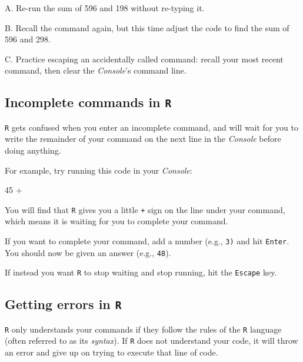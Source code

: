 \documentclass[
]{book}
\newenvironment{Shaded}{\begin{snugshade}}{\end{snugshade}}
\newcommand{\DecValTok}[1]{\textcolor[rgb]{0.00,0.00,0.81}{#1}}
\newcommand{\SpecialCharTok}[1]{\textcolor[rgb]{0.00,0.00,0.00}{#1}}
\begin{document}
A. Re-run the sum of 596 and 198 without re-typing it.

B. Recall the command again, but this time adjust the code to find the sum of 596 and 298.

C. Practice escaping an accidentally called command: recall your most recent command, then clear the \emph{Console}'s command line.

\hypertarget{incomplete-commands-in-r}{%
\subsection*{\texorpdfstring{Incomplete commands in \texttt{R}}{Incomplete commands in R}}\label{incomplete-commands-in-r}}

\texttt{R} gets confused when you enter an incomplete command, and will wait for you to write the remainder of your command on the next line in the \emph{Console} before doing anything.

For example, try running this code in your \emph{Console}:

\begin{Shaded}
\begin{Highlighting}[]
\DecValTok{45} \SpecialCharTok{+}
\end{Highlighting}
\end{Shaded}

You will find that \texttt{R} gives you a little \texttt{+} sign on the line under your command, which means it is waiting for you to complete your command.

If you want to complete your command, add a number (e.g., \texttt{3)} and hit \texttt{Enter}. You should now be given an answer (e.g., \texttt{48}).

If instead you want \texttt{R} to stop waiting and stop running, hit the \texttt{Escape} key.

\hypertarget{getting-errors-in-r}{%
\subsection*{\texorpdfstring{Getting errors in \texttt{R}}{Getting errors in R}}\label{getting-errors-in-r}}

\texttt{R} only understands your commands if they follow the rules of the \texttt{R} language (often referred to as its \emph{syntax}). If \texttt{R} does not understand your code, it will throw an error and give up on trying to execute that line of code.
\end{document}
